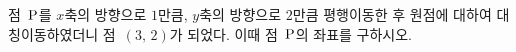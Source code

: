 점~$\mathrm{P}$를 $x$축의 방향으로 $1$만큼, $y$축의 방향으로 $2$만큼 평행이동한 후 원점에 대하여 대칭이동하였더니 점~$(3,\,2)$가 되었다. 이때 점~$\mathrm{P}$의 좌표를 구하시오.
